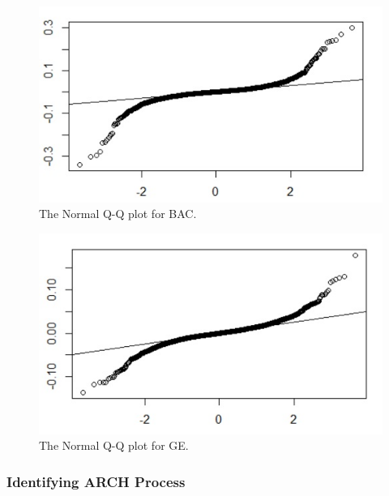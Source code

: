 \documentclass[a4paper,11pt,english]{article}
\begin{document}
			\begin{figure}[H]
				\begin{center}
					\includegraphics[scale=0.6]{bacqqplot.JPG}
					\caption{The Normal Q-Q plot for BAC.}
					\label{fig:bacqqplot}
				\end{center}
			\end{figure}
		 
			\begin{figure}[H]
				\begin{center}
					\includegraphics[scale=0.6]{geqqplot.JPG}
					\caption{The Normal Q-Q plot for GE.}
					\label{fig:geqqplot}
				\end{center}
			\end{figure}

			
			\subsubsection{Identifying ARCH Process}
        
\end{document}
